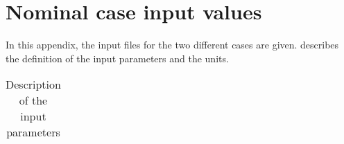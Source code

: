 \chapter{Nominal case input values} 				
\label{app:appendixF-nominalCaseInputValues}

In this appendix, the input files for the two different cases are given.
 describes the definition of the input parameters and the units.




\begin{longtable}{|l|p{10cm}|}
\caption{Description of the input parameters}
\label{tab:inputFileDefinition}
\endfirsthead
\endhead
\hline


\end{longtable}
